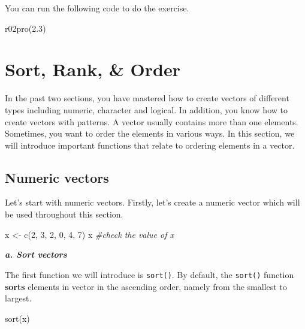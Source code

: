 \documentclass[
]{book}
\newenvironment{Shaded}{\begin{snugshade}}{\end{snugshade}}
\newcommand{\CommentTok}[1]{\textcolor[rgb]{0.56,0.35,0.01}{\textit{#1}}}
\newcommand{\DecValTok}[1]{\textcolor[rgb]{0.00,0.00,0.81}{#1}}
\newcommand{\FloatTok}[1]{\textcolor[rgb]{0.00,0.00,0.81}{#1}}
\newcommand{\FunctionTok}[1]{\textcolor[rgb]{0.00,0.00,0.00}{#1}}
\newcommand{\NormalTok}[1]{#1}
\newcommand{\OtherTok}[1]{\textcolor[rgb]{0.56,0.35,0.01}{#1}}
\begin{document}
You can run the following code to do the exercise.

\begin{Shaded}
\begin{Highlighting}[]
\FunctionTok{r02pro}\NormalTok{(}\FloatTok{2.3}\NormalTok{)}
\end{Highlighting}
\end{Shaded}

\hypertarget{sort-vector}{%
\section{Sort, Rank, \& Order}\label{sort-vector}}

In the past two sections, you have mastered how to create vectors of different types including numeric, character and logical. In addition, you know how to create vectors with patterns. A vector usually contains more than one elements. Sometimes, you want to order the elements in various ways. In this section, we will introduce important functions that relate to ordering elements in a vector.

\hypertarget{numeric-vectors}{%
\subsection{Numeric vectors}\label{numeric-vectors}}

Let's start with numeric vectors. Firstly, let's create a numeric vector which will be used throughout this section.

\begin{Shaded}
\begin{Highlighting}[]
\NormalTok{x }\OtherTok{\textless{}{-}} \FunctionTok{c}\NormalTok{(}\DecValTok{2}\NormalTok{, }\DecValTok{3}\NormalTok{, }\DecValTok{2}\NormalTok{, }\DecValTok{0}\NormalTok{, }\DecValTok{4}\NormalTok{, }\DecValTok{7}\NormalTok{) }
\NormalTok{x }\CommentTok{\#check the value of x}
\end{Highlighting}
\end{Shaded}

\textbf{\emph{a. Sort vectors}}

The first function we will introduce is \texttt{sort()}. By default, the \texttt{sort()} function \textbf{sorts} elements in vector in the ascending order, namely from the smallest to largest.

\begin{Shaded}
\begin{Highlighting}[]
\FunctionTok{sort}\NormalTok{(x)}
\end{Highlighting}
\end{Shaded}
\end{document}
